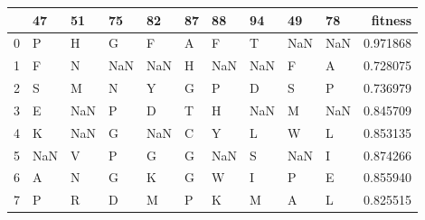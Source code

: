\begin{tabular}{llllllllllr}
\toprule
{} &   47 &   51 &   75 &   82 & 87 &   88 &   94 &   49 &   78 &   fitness \\
\midrule
0 &    P &    H &    G &    F &  A &    F &    T &  NaN &  NaN &  0.971868 \\
1 &    F &    N &  NaN &  NaN &  H &  NaN &  NaN &    F &    A &  0.728075 \\
2 &    S &    M &    N &    Y &  G &    P &    D &    S &    P &  0.736979 \\
3 &    E &  NaN &    P &    D &  T &    H &  NaN &    M &  NaN &  0.845709 \\
4 &    K &  NaN &    G &  NaN &  C &    Y &    L &    W &    L &  0.853135 \\
5 &  NaN &    V &    P &    G &  G &  NaN &    S &  NaN &    I &  0.874266 \\
6 &    A &    N &    G &    K &  G &    W &    I &    P &    E &  0.855940 \\
7 &    P &    R &    D &    M &  P &    K &    M &    A &    L &  0.825515 \\
\bottomrule
\end{tabular}
